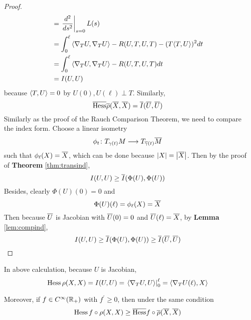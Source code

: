\begin{enumerate}[label=\arabic{*}]
\begin{proof}
\begin{equation*}
\begin{aligned}
				&=  \left.\frac{d^2}{ds^2}\right\lvert_{s=0} L(s) \\
				&= \int_0^\ell\left\langle\nabla_T U, \nabla_T U\right\rangle-R(U, T, U, T)-(T\langle T, U\rangle)^2 d t \\
				&= \int_0^\ell\left\langle\nabla_T U, \nabla_T U\right\rangle-R(U, T, U, T) d t \\
				&= I(U,U)
			\end{aligned}
		\end{equation*}
		because $\left\langle T,U \right\rangle = 0$ by $U(0),U(\ell) \perp T$. Similarly,
		\begin{equation*}
			\overline{\operatorname{Hess}} \overline{\rho}(\overline{X},\overline{X}) = \overline{I}(\overline{U},\overline{U})
		\end{equation*}
		Similarly as the proof of the Rauch Comparison Theorem, we need to compare the index form. Choose a linear isometry
		\begin{equation*}
			\phi_{t}\colon T_{\gamma(t)}M \longrightarrow T_{\overline{\gamma}(t)}\overline{M}
		\end{equation*}
		such that $\phi_{\ell}(X) = \overline{X}$, which can be done because $\left\lvert X\right\lvert = \left\lvert\overline{X}\right\lvert$. Then by the proof of \textbf{Theorem} \ref{thm:transind},
		\begin{equation*}
			I(U,U) \geq \overline{I}(\Phi(U),\Phi(U))
		\end{equation*}
		Besides, clearly $\Phi(U)(0) = 0$ and
		\begin{equation*}
			\Phi(U)(\ell) = \phi_{\ell}(X) = \overline{X}
		\end{equation*}
		Then because $\overline{U}$ is Jacobian with $\overline{U}(0) = 0$ and $\overline{U}(\ell) = \overline{X}$, by \textbf{Lemma} \ref{lem:compind},
		\begin{equation*}
			I(U,U) \geq \overline{I}(\Phi(U),\Phi(U)) \geq \overline{I}(\overline{U},\overline{U}) \qedhere
		\end{equation*}
	\end{proof}
	\begin{rmk}
		In above calculation, because $U$ is Jacobian,
		\begin{equation*}
			\operatorname{Hess}\rho(X,X) = I(U,U) = \left.\left\langle \nabla_TU,U \right\rangle\right\lvert_0^\ell = \left\langle \nabla_TU(\ell),X \right\rangle
		\end{equation*}
	\end{rmk}
	\begin{rmk}
		Moreover, if $f \in C^\infty(\mathbb{R}_+)$ with $f^\prime \geq 0$, then under the same condition
		\begin{equation*}
			\operatorname{Hess} f\circ\rho(X,X) \geq \overline{\operatorname{Hess}} f \circ\overline{\rho}(\overline{X},\overline{X})
		\end{equation*}

\end{rmk}
\end{enumerate}
